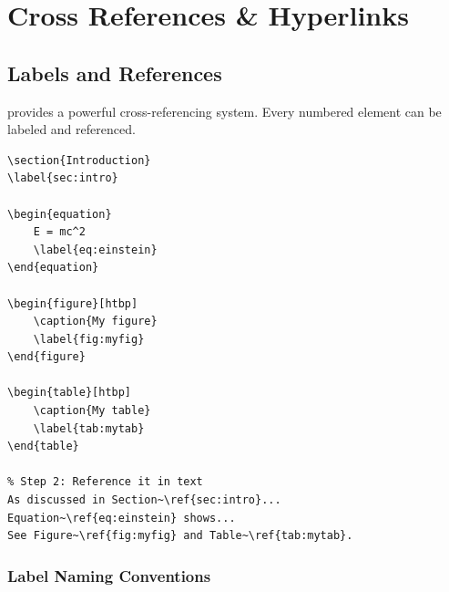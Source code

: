 
\chapter{Cross References \& Hyperlinks}

\section{Labels and References}

\latex{} provides a powerful cross-referencing system. Every numbered element can be labeled and referenced.

\begin{lstlisting}[language={[LaTeX]TeX}, caption=Label and reference]
% Step 1: Place a label after the numbered element
\section{Introduction}
\label{sec:intro}

\begin{equation}
    E = mc^2
    \label{eq:einstein}
\end{equation}

\begin{figure}[htbp]
    \caption{My figure}
    \label{fig:myfig}
\end{figure}

\begin{table}[htbp]
    \caption{My table}
    \label{tab:mytab}
\end{table}

% Step 2: Reference it in text
As discussed in Section~\ref{sec:intro}...
Equation~\ref{eq:einstein} shows...
See Figure~\ref{fig:myfig} and Table~\ref{tab:mytab}.
\end{lstlisting}

\subsection{Label Naming Conventions}

